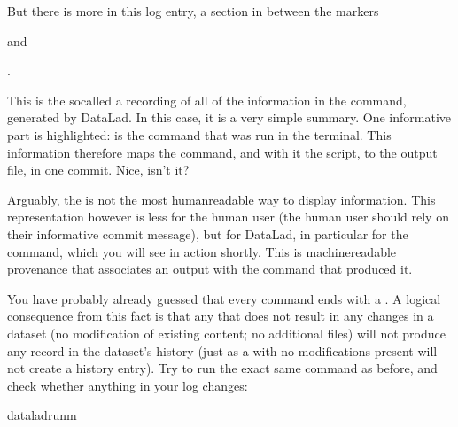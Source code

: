 \sphinxAtStartPar
But there is more in this log entry, a section in between the markers

\sphinxAtStartPar
{} and

\sphinxAtStartPar
{}.

\sphinxAtStartPar
This is the so\sphinxhyphen{}called  \textendash{} a recording of all of the
information in the  command, generated by DataLad.
In this case, it is a very simple summary. One informative
part is highlighted:
 is the command that was run
in the terminal.
This information therefore maps the command, and with it the script,
to the output file, in one commit. Nice, isn’t it?

\sphinxAtStartPar
Arguably, the {\hyperref[\detokenize{glossary:term-run-record}]{}} is not the most human\sphinxhyphen{}readable way to display information.
This representation however is less for the human user (the human user should
rely on their informative commit message), but for DataLad, in particular for the
 command, which you will see in action shortly. This
 is machine\sphinxhyphen{}readable provenance that associates an output with
the command that produced it.

\sphinxAtStartPar
You have probably already guessed that every  command
ends with a . A logical consequence from this fact is that any
 that does not result in any changes in a dataset (no modification
of existing content; no additional files) will not produce any record in the
dataset’s history (just as a  with no modifications present
will not create a history entry). Try to run the exact same
command as before, and check whether anything in your log changes:

\begin{sphinxVerbatim}[commandchars=\\\{\}]
dataladrun\PYGZhy{}m
\end{sphinxVerbatim}

